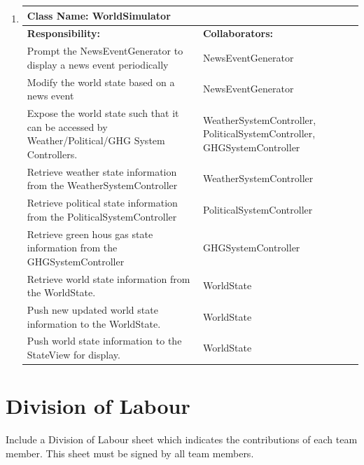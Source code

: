 \documentclass[]{article}
\begin{document}
\begin{enumerate}[1.]
	\item
	\begin{tabular}{|p{10cm}|p{4cm}|}
	    \hline
	     \multicolumn{2}{|l|}{\textbf{Class Name:  WorldSimulator}} \\
	    \hline
	    \textbf{Responsibility:} & \textbf{Collaborators:} \\
	    \hline
			Prompt the NewsEventGenerator to display a news event periodically & NewsEventGenerator \\
			Modify the world state based on a news event & NewsEventGenerator \\
			Expose the world state such that it can be accessed by Weather/Political/GHG System Controllers. & WeatherSystemController, PoliticalSystemController, GHGSystemController \\
			Retrieve weather state information from the WeatherSystemController & WeatherSystemController \\
			Retrieve political state information from the PoliticalSystemController & PoliticalSystemController \\
			Retrieve green hous gas state information from the GHGSystemController & GHGSystemController \\
			Retrieve world state information from the WorldState. & WorldState \\
			Push new updated world state information to the WorldState. & WorldState \\
			Push world state information to the StateView for display. & WorldState \\

	    \hline
	  \end{tabular}


\end{enumerate}

\appendix
\section{Division of Labour}
\label{sec:division_of_labour}
Include a Division of Labour sheet which indicates the contributions of each team member. This sheet must be signed by all team members.
\end{document}
